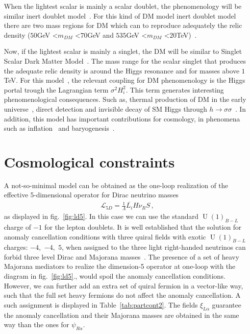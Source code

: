 \documentclass[12pt]{article}
\begin{document}
When the lightest scalar  is mainly a scalar doublet, the phenomenology will be similar inert doublet model~\cite{Honorez:2010re}. For this kind of DM model  inert doublet model there are two mass regions for DM which can to reproduce adequately the relic density ($50$GeV \textless $m_{DM}$ \textless $70$GeV and $535$GeV \textless $m_{DM}$ \textless $20$TeV)~\cite{Garcia-Cely:2015khw}.


Now, if the lightest scalar is mainly a singlet, the DM will be
similar to Singlet Scalar Dark Matter
Model~\cite{Athron:2017kgt}.
The mass range for the scalar singlet that produces the adequate relic
density is around the Higgs resonance and for masses above $1$TeV. For
this model~\cite{}, the relevant coupling for DM phenomenology is the
Higgs portal trough the Lagrangian term $\sigma^{2} H^{2}_{i}$.
This term generates interesting phenomenological consequences.
Such as, thermal production of DM in the early
universe~\cite{Yaguna:2008hd}, direct detection and invisible decay of
SM Higgs through $h \to \sigma \sigma$~\cite{Mambrini:2011ik}.
In addition, this model has important contributions for cosmology, in
phenomena such as inflation~\cite{Lerner:2009xg} and
baryogenesis~\cite{Cline:2012hg}.

\section{Cosmological constraints}

A not-so-minimal model can be obtained as the one-loop realization of
the effective 5-dimensional operator for Dirac neutrino masses~\cite{Gu:2006dc}
\begin{align}
  \label{eq:ld5}
  \mathcal{L}_{5D}=\frac{1}{\Lambda} \overline{L_i} H \nu_R S\,,
\end{align}
as displayed in fig.~\ref{fig:ld5}.
In this case we can use the standard $\operatorname{U}(1)_{B-L}$
charge of $-1$ for the lepton doublets.
It is well established that the solution for anomaly cancellation
conditions with three quiral fields with exotic
$\operatorname{U}(1)_{B-L}$ charges: $-4$,~$-4$,~$5$,  when assigned to the
three light right-handed neutrinos can forbid three level Dirac and
Majorana masses~\cite{Calle:2018ovc}.
The presence of a set of heavy Majorana mediators to realize the
dimension-5 operator at one-loop with the diagram in
fig.~\ref{fig:ld5}., would spoil the anomaly cancellation conditions.
However, we can further add an extra set of quiral fermion in a
vector-like way, such that the full set heavy fermions do not affect
the anomaly cancellation. A such assignment is displayed in
Table~\ref{tab:partcont2}.
The fields $\xi_{L \alpha}$ guarantee the anomaly cancellation and
their Majorana masses are obtained in the same way than the ones for
$\psi_{R\alpha}$.
\end{document}
